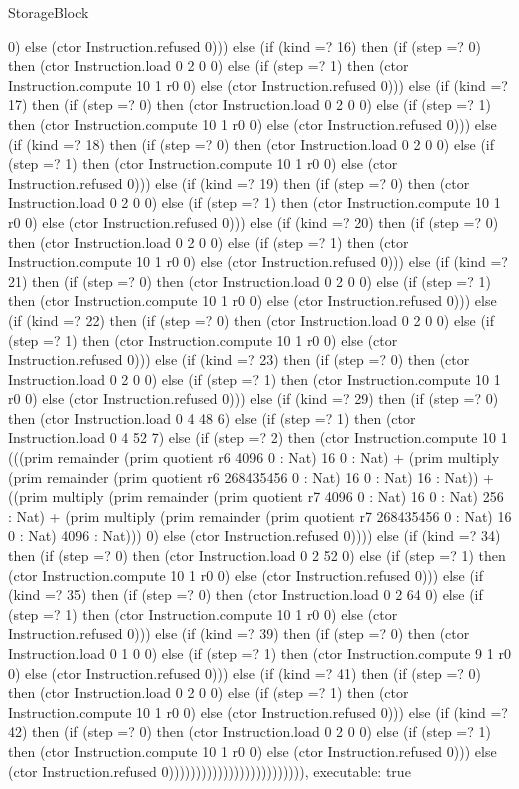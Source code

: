 \begin{lexlean}{StorageBlock}
\begin{semanticmodule}
{0) else (ctor Instruction.refused 0))) else (if (kind =? 16) then (if (step =? 0) then (ctor Instruction.load 0 2 0 0) else (if (step =? 1) then (ctor Instruction.compute 10 1 r0 0) else (ctor Instruction.refused 0))) else (if (kind =? 17) then (if (step =? 0) then (ctor Instruction.load 0 2 0 0) else (if (step =? 1) then (ctor Instruction.compute 10 1 r0 0) else (ctor Instruction.refused 0))) else (if (kind =? 18) then (if (step =? 0) then (ctor Instruction.load 0 2 0 0) else (if (step =? 1) then (ctor Instruction.compute 10 1 r0 0) else (ctor Instruction.refused 0))) else (if (kind =? 19) then (if (step =? 0) then (ctor Instruction.load 0 2 0 0) else (if (step =? 1) then (ctor Instruction.compute 10 1 r0 0) else (ctor Instruction.refused 0))) else (if (kind =? 20) then (if (step =? 0) then (ctor Instruction.load 0 2 0 0) else (if (step =? 1) then (ctor Instruction.compute 10 1 r0 0) else (ctor Instruction.refused 0))) else (if (kind =? 21) then (if (step =? 0) then (ctor Instruction.load 0 2 0 0) else (if (step =? 1) then (ctor Instruction.compute 10 1 r0 0) else (ctor Instruction.refused 0))) else (if (kind =? 22) then (if (step =? 0) then (ctor Instruction.load 0 2 0 0) else (if (step =? 1) then (ctor Instruction.compute 10 1 r0 0) else (ctor Instruction.refused 0))) else (if (kind =? 23) then (if (step =? 0) then (ctor Instruction.load 0 2 0 0) else (if (step =? 1) then (ctor Instruction.compute 10 1 r0 0) else (ctor Instruction.refused 0))) else (if (kind =? 29) then (if (step =? 0) then (ctor Instruction.load 0 4 48 6) else (if (step =? 1) then (ctor Instruction.load 0 4 52 7) else (if (step =? 2) then (ctor Instruction.compute 10 1 (((prim remainder (prim quotient r6 4096 0 : Nat) 16 0 : Nat) + (prim multiply (prim remainder (prim quotient r6 268435456 0 : Nat) 16 0 : Nat) 16 : Nat)) + ((prim multiply (prim remainder (prim quotient r7 4096 0 : Nat) 16 0 : Nat) 256 : Nat) + (prim multiply (prim remainder (prim quotient r7 268435456 0 : Nat) 16 0 : Nat) 4096 : Nat))) 0) else (ctor Instruction.refused 0)))) else (if (kind =? 34) then (if (step =? 0) then (ctor Instruction.load 0 2 52 0) else (if (step =? 1) then (ctor Instruction.compute 10 1 r0 0) else (ctor Instruction.refused 0))) else (if (kind =? 35) then (if (step =? 0) then (ctor Instruction.load 0 2 64 0) else (if (step =? 1) then (ctor Instruction.compute 10 1 r0 0) else (ctor Instruction.refused 0))) else (if (kind =? 39) then (if (step =? 0) then (ctor Instruction.load 0 1 0 0) else (if (step =? 1) then (ctor Instruction.compute 9 1 r0 0) else (ctor Instruction.refused 0))) else (if (kind =? 41) then (if (step =? 0) then (ctor Instruction.load 0 2 0 0) else (if (step =? 1) then (ctor Instruction.compute 10 1 r0 0) else (ctor Instruction.refused 0))) else (if (kind =? 42) then (if (step =? 0) then (ctor Instruction.load 0 2 0 0) else (if (step =? 1) then (ctor Instruction.compute 10 1 r0 0) else (ctor Instruction.refused 0))) else (ctor Instruction.refused 0))))))))))))))))))))))))),
  executable: true
}


\end{semanticmodule}
\end{lexlean}
